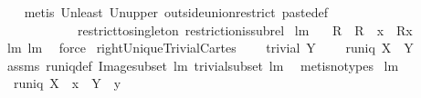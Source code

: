 \begin{isabellebody}
%
\isadelimproof
\ \ %
\endisadelimproof
%
\isatagproof
{}\isamarkupfalse%
\ {\isacharparenleft}metis\ Un{\isacharunderscore}least\ Un{\isacharunderscore}upper{}\ outside{\isacharunderscore}union{\isacharunderscore}restrict\ paste{\isacharunderscore}def\ \isanewline
\ \ \ \ \ \ \ \ \ \ \ \ restrict{\isacharunderscore}to{\isacharunderscore}singleton\ restriction{\isacharunderscore}is{\isacharunderscore}subrel{\isacharparenright}%
\endisatagproof
{\isafoldproof}%
%
\isadelimproof
\isanewline
%
\endisadelimproof
\isanewline
{}\isamarkupfalse%
\ lm{}{}{}{\isacharcolon}\ \isanewline
\ \ {\isachardoublequoteopen}R\ {\isacharequal}\ R\ {\isacharplus}{\isacharasterisk}\ {\isacharparenleft}{\isacharbraceleft}x{\isacharbraceright}\ {\isasymtimes}\ {\isacharparenleft}R{\isacharbackquote}{\isacharbackquote}{\isacharbraceleft}x{\isacharbraceright}{\isacharparenright}{\isacharparenright}{\isachardoublequoteclose}\ \isanewline
%
\isadelimproof
\ \ %
\endisadelimproof
%
\isatagproof
{}\isamarkupfalse%
\ lm{}{}{}\ lm{}{}{}\ \isamarkupfalse%
\ force%
\endisatagproof
{\isafoldproof}%
%
\isadelimproof
\isanewline
%
\endisadelimproof
\isanewline
{}\isamarkupfalse%
\ rightUniqueTrivialCartes{\isacharcolon}\ \isanewline
\ \ \ {\isachardoublequoteopen}trivial\ Y{\isachardoublequoteclose}\ \isanewline
\ \ \ {\isachardoublequoteopen}runiq\ {\isacharparenleft}X\ {\isasymtimes}\ Y{\isacharparenright}{\isachardoublequoteclose}\ \isanewline
%
\isadelimproof
\ \ %
\endisadelimproof
%
\isatagproof
{}\isamarkupfalse%
\ assms\ runiq{\isacharunderscore}def\ Image{\isacharunderscore}subset\ lm{}{}{}\ trivial{\isacharunderscore}subset\ lm{}{}{}\ \isamarkupfalse%
\ {\isacharparenleft}metis{\isacharparenleft}no{\isacharunderscore}types{\isacharparenright}{\isacharparenright}%
\endisatagproof
{\isafoldproof}%
%
\isadelimproof
\isanewline
%
\endisadelimproof
\isanewline
\isanewline
{}\isamarkupfalse%
\ lm{}{}{}{\isacharcolon}\ \isanewline
\ \ {\isachardoublequoteopen}runiq\ {\isacharparenleft}{\isacharparenleft}X\ {\isasymtimes}\ {\isacharbraceleft}x{\isacharbraceright}{\isacharparenright}\ {\isacharplus}{\isacharasterisk}\ {\isacharparenleft}Y\ {\isasymtimes}\ {\isacharbraceleft}y{\isacharbraceright}{\isacharparenright}{\isacharparenright}{\isachardoublequoteclose}\ \isanewline

\end{isabellebody}
